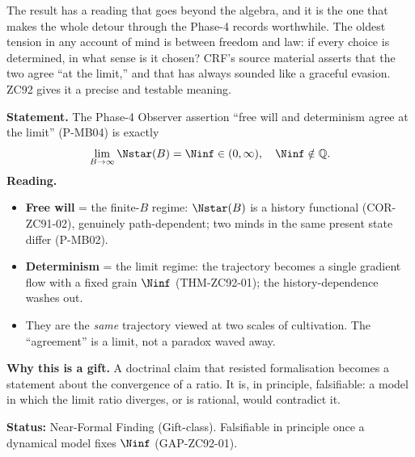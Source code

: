 \documentclass[12pt, a4paper]{article}
\begin{document}
The result has a reading that goes beyond the algebra, and it is the one
that makes the whole detour through the Phase-4 records worthwhile. The
oldest tension in any account of mind is between freedom and law: if every
choice is determined, in what sense is it chosen? CRF's source material
asserts that the two agree ``at the limit,'' and that has always sounded
like a graceful evasion. ZC92 gives it a precise and testable meaning.

\begin{giftbox}[title={FIND-ZC92-01: Free Will and Determinism as One
  Trajectory at Two Scales (Gift)}]
\textbf{Statement.} The Phase-4 Observer assertion ``free will and
determinism agree at the limit'' (P-MB04) is exactly
\[
  \lim_{B\to\infty}\Nstar(B)=\Ninf\in(0,\infty),\quad\Ninf\notin\mathbb{Q}.
\]
\textbf{Reading.}
\begin{itemize}[leftmargin=2em, noitemsep]
  \item \textbf{Free will} = the finite-$B$ regime: $\Nstar(B)$ is a
    history functional (COR-ZC91-02), genuinely path-dependent; two minds
    in the same present state differ (P-MB02).
  \item \textbf{Determinism} = the limit regime: the trajectory becomes a
    single gradient flow with a fixed grain $\Ninf$ (THM-ZC92-01); the
    history-dependence washes out.
  \item They are the \emph{same} trajectory viewed at two scales of
    cultivation. The ``agreement'' is a limit, not a paradox waved away.
\end{itemize}

\textbf{Why this is a gift.} A doctrinal claim that resisted formalisation
becomes a statement about the convergence of a ratio. It is, in
principle, falsifiable: a model in which the limit ratio diverges, or is
rational, would contradict it.


\textbf{Status:} Near-Formal Finding (Gift-class). Falsifiable in
principle once a dynamical model fixes $\Ninf$ (GAP-ZC92-01).
\end{giftbox}

\end{document}
